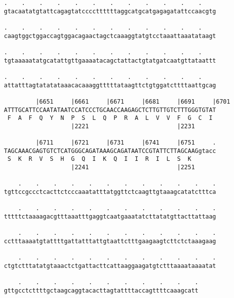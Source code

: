 \documentclass{article}
\begin{document}
\begin{Verbatim}
.    .    .    .    .    .    .    .    .    .    .    .    
gtacaatatgtattcagagtatccccttttttaggcatgcatgagagatattccaacgtg
                                                            
.    .    .    .    .    .    .    .    .    .    .    .    
caagtggctggaccagtggacagaactagctcaaaggtatgtcctaaattaaatataagt
                                                            
.    .    .    .    .    .    .    .    .    .    .    .    
tgtaaaaatatgcatattgttgaaaatacagctattactgtatgatcaatgttataattt
                                                            
.    .    .    .    .    .    .    .    .    .    .    .    
attatttagtatatataaacacaaaggtttttataagttctgtggatcttttaattgcag
                                                            
         |6651     |6661     |6671     |6681     |6691     |6701
ATTTGCATTCCAATATAATCCATCCCTGCAACCAAGAGCTCTTGTTGTCTTTGGGTGTAT
 F  A  F  Q  Y  N  P  S  L  Q  P  R  A  L  V  V  F  G  C  I 
                   |2221                         |2231      
  
         |6711     |6721     |6731     |6741     |6751     .
TAGCAAACGAGTGTCTCATGGGCAGATAAAGCAGATAATCCGTATTCTTAGCAAGgtacc
 S  K  R  V  S  H  G  Q  I  K  Q  I  I  R  I  L  S  K       
                   |2241                         |2251      
  
    .    .    .    .    .    .    .    .    .    .    .    .
tgttccgccctcacttctcccaaatatttatggttctcaagttgtaaagcatatctttca
                                                            
    .    .    .    .    .    .    .    .    .    .    .    .
tttttctaaaagacgtttaaatttgaggtcaatgaaatatcttatatgttacttattaag
                                                            
    .    .    .    .    .    .    .    .    .    .    .    .
cctttaaaatgtattttgattatttattgtaattctttgaagaagtcttctctaaagaag
                                                            
    .    .    .    .    .    .    .    .    .    .    .    .
ctgtctttatatgtaaactctgattacttcattaaggaagatgtctttaaaataaaatat
                                                            
    .    .    .    .    .    .    .    .    .    .    .
gttgcctcttttgctaagcaggtacacttagtattttaccagttttcaaagcatt
                                                       
                                                       
 

\end{Verbatim}
\end{document}
